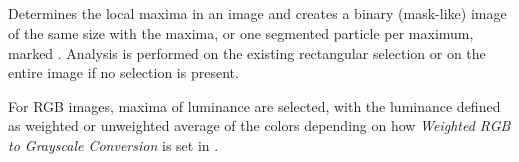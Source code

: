 \subsection[\protect\userinterface{Find Maxima\ldots{}}]{\protect{}\label{sub:Find-Maxima}\improvement{}}

Determines the local maxima
in an image and creates a binary (mask-like) image of the same size
with the maxima, or one segmented particle per maximum, marked \cite{C-Find-Maxima}.
Analysis is performed on the existing rectangular selection or on
the entire image if no selection is present.

For RGB images, maxima of luminance are selected, with the luminance
defined as weighted or unweighted average of the colors depending
on how \emph{Weighted RGB to Grayscale Conversion} is set in .

